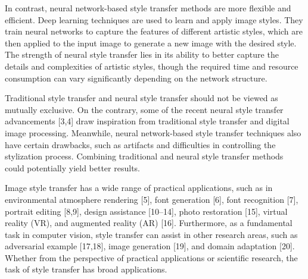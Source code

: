 In contrast, neural network-based style transfer methods are more flexible and efficient. Deep learning techniques are used to learn and apply image styles. They train neural networks to capture the features of different artistic styles, which are then applied to the input image to generate a new image with the desired style. The strength of neural style transfer lies in its ability to better capture the details and complexities of artistic styles, though the required time and resource consumption can vary significantly depending on the network structure.

Traditional style transfer and neural style transfer should not be viewed as mutually exclusive. On the contrary, some of the recent neural style transfer advancements [3,4] draw inspiration from traditional style transfer and digital image processing. Meanwhile, neural network-based style transfer techniques also have certain drawbacks, such as artifacts and difficulties in controlling the stylization process. Combining traditional and neural style transfer methods could potentially yield better results.

Image style transfer has a wide range of practical applications, such as in environmental atmosphere rendering [5], font generation [6], font recognition [7], portrait editing [8,9], design assistance [10–14], photo restoration [15], virtual reality (VR), and augmented reality (AR) [16].
Furthermore, as a fundamental task in computer vision, style transfer can assist in other research areas, such as adversarial example [17,18], image generation [19], and domain adaptation [20]. Whether from the perspective of practical applications or scientific research, the task of style transfer has broad applications.


